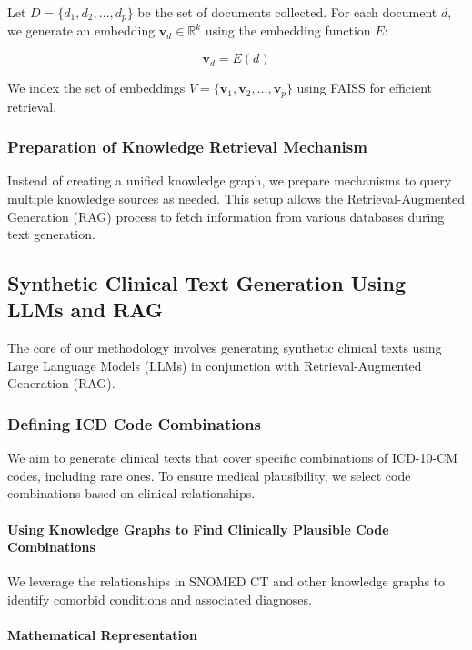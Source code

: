 \documentclass[12pt, a4paper]{article}
\begin{document}
Let \( D = \{d_1, d_2, ..., d_p\} \) be the set of documents collected. For each document \( d \), we generate an embedding \( \mathbf{v}_d \in \mathbb{R}^k \) using the embedding function \( E \):

\[
\mathbf{v}_d = E(d)
\]

We index the set of embeddings \( V = \{\mathbf{v}_1, \mathbf{v}_2, ..., \mathbf{v}_p\} \) using FAISS for efficient retrieval.

\subsubsection{Preparation of Knowledge Retrieval Mechanism}

Instead of creating a unified knowledge graph, we prepare mechanisms to query multiple knowledge sources as needed. This setup allows the Retrieval-Augmented Generation (RAG) process to fetch information from various databases during text generation.

\subsection{Synthetic Clinical Text Generation Using LLMs and RAG}

The core of our methodology involves generating synthetic clinical texts using Large Language Models (LLMs) in conjunction with Retrieval-Augmented Generation (RAG).

\subsubsection{Defining ICD Code Combinations}

We aim to generate clinical texts that cover specific combinations of ICD-10-CM codes, including rare ones. To ensure medical plausibility, we select code combinations based on clinical relationships.

\paragraph{Using Knowledge Graphs to Find Clinically Plausible Code Combinations}

We leverage the relationships in SNOMED CT and other knowledge graphs to identify comorbid conditions and associated diagnoses.

\paragraph{Mathematical Representation}
\end{document}
